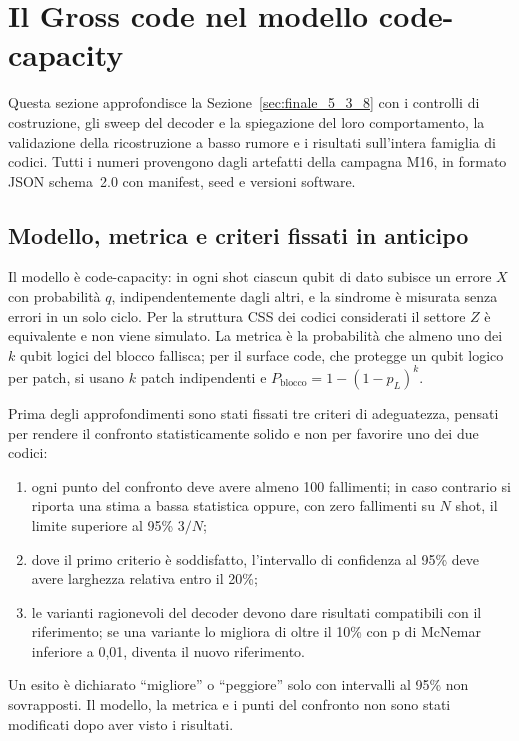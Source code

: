 \section{Il Gross code nel modello code-capacity}
\label{app:gross}
\begin{onehalfspace}

Questa sezione approfondisce la Sezione~\ref{sec:finale_5_3_8} con i
controlli di costruzione, gli sweep del decoder e la spiegazione del loro
comportamento, la validazione della ricostruzione a basso rumore e i
risultati sull'intera famiglia di codici. Tutti i numeri provengono dagli
artefatti della campagna M16, in formato JSON schema~2.0 con manifest, seed e
versioni software.

\subsection{Modello, metrica e criteri fissati in anticipo}
\label{app:gross_modello}

Il modello è code-capacity: in ogni shot ciascun qubit di dato subisce un
errore $X$ con probabilità $q$, indipendentemente dagli altri, e la
sindrome è misurata senza errori in un solo ciclo. Per la struttura CSS
dei codici considerati il settore $Z$ è equivalente e non viene simulato.
La metrica è la probabilità che almeno uno dei $k$ qubit logici del blocco
fallisca; per il surface code, che protegge un qubit logico per patch, si
usano $k$ patch indipendenti e $P_{\text{blocco}} = 1-(1-p_L)^k$.

Prima degli approfondimenti sono stati fissati tre criteri di
adeguatezza, pensati per rendere il confronto statisticamente solido e
non per favorire uno dei due codici:
\begin{enumerate}
\item ogni punto del confronto deve avere almeno 100 fallimenti; in caso
  contrario si riporta una stima a bassa statistica oppure, con zero
  fallimenti su $N$ shot, il limite superiore al 95\% $3/N$;
\item dove il primo criterio è soddisfatto, l'intervallo di confidenza al
  95\% deve avere larghezza relativa entro il 20\%;
\item le varianti ragionevoli del decoder devono dare risultati
  compatibili con il riferimento; se una variante lo migliora di oltre il
  10\% con p di McNemar inferiore a 0,01, diventa il nuovo riferimento.
\end{enumerate}
Un esito è dichiarato ``migliore'' o ``peggiore'' solo con intervalli al
95\% non sovrapposti. Il modello, la metrica e i punti del confronto non
sono stati modificati dopo aver visto i risultati.


\end{onehalfspace}
